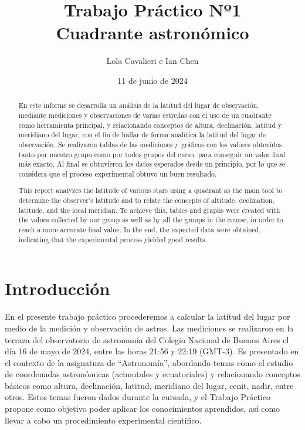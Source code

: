 \documentclass[11pt, a4paper]{article} %
\title{Trabajo Práctico Nº1 \\ Cuadrante astronómico}
\author{Lola Cavalieri e Ian Chen}
\date{11 de junio de 2024}
\begin{document}
\maketitle
\onehalfspacing
\vspace{1cm}
\begin{abstract}
    En este informe se desarrolla un análisis de la latitud del lugar de observación, mediante mediciones y observaciones de varias estrellas con el uso de un cuadrante como herramienta principal, y relacionando conceptos de altura, declinación, latitud y meridiano del lugar, con el fin de hallar de forma analítica la latitud del lugar de observación. Se realizaron tablas de las mediciones y gráficos con los valores obtenidos tanto por nuestro grupo como por todos grupos del curso, para conseguir un valor final más exacto. Al final se obtuvieron los datos esperados desde un principio, por lo que se considera que el proceso experimental obtuvo un buen resultado.
\end{abstract}

\begin{abstract}
This report analyzes the latitude of various stars using a quadrant as the main tool to determine the observer's latitude and to relate the concepts of altitude, declination, latitude, and the local meridian. To achieve this, tables and graphs were created with the values collected by our group as well as by all the groups in the course, in order to reach a more accurate final value. In the end, the expected data were obtained, indicating that the experimental process yielded good results.
\end{abstract}

\newpage


\section{Introducción}
En el presente trabajo práctico procederemos a calcular la latitud del lugar por medio de la medición y observación de astros. 
Las mediciones se realizaron en la terraza del observatorio de astronomía del Colegio Nacional de Buenos Aires el día 16 de mayo de 2024, entre las horas 21:56 y 22:19 (GMT-3). 
Es presentado en el contexto de la asignatura de “Astronomía”, abordando temas como el estudio de coordenadas astronómicas (acimutales y ecuatoriales) y relacionando conceptos básicos como altura, declinación, latitud, meridiano del lugar, cenit, nadir, entre otros.
Estos temas fueron dados durante la cursada, y el Trabajo Práctico propone como objetivo poder aplicar los conocimientos aprendidos, así como llevar a cabo un procedimiento experimental científico.
\end{document}

